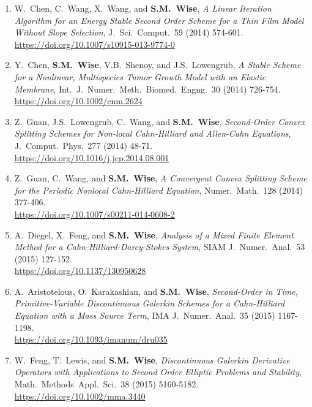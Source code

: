 \documentclass[11pt]{letter}
\begin{document}
\begin{enumerate}
    \item
W.~Chen, C.~Wang, X.~Wang, and \textbf{S.M.~Wise}, {\sl A Linear Iteration Algorithm for an Energy Stable Second Order Scheme for a Thin Film Model Without Slope Selection}, J.~Sci.~Comput.~59 (2014) 574-601.
	\\
\url{https://doi.org/10.1007/s10915-013-9774-0}

    \item
Y.~Chen, \textbf{S.M.~Wise}, V.B.~Shenoy, and J.S.~Lowengrub, {\sl A Stable Scheme for a Nonlinear, Multispecies Tumor Growth Model with an Elastic Membrane}, Int.~J.~Numer.~Meth.~Biomed.~Engng.~30 (2014) 726-754.
	\\ 
\url{https://doi.org/10.1002/cnm.2624}

	\item
Z.~Guan, J.S.~Lowengrub, C.~Wang, and \textbf{S.M.~Wise}, {\sl Second-Order Convex Splitting Schemes for Non-local Cahn-Hilliard and Allen-Cahn Equations}, J.~Comput.~Phys.~277 (2014) 48-71.
	\\ 
\url{https://doi.org/10.1016/j.jcp.2014.08.001}

	\item
Z.~Guan, C.~Wang, and \textbf{S.M.~Wise}, {\sl A Convergent Convex Splitting Scheme for the Periodic Nonlocal Cahn-Hilliard Equation}, Numer.~Math.~128 (2014) 377-406.
	\\ 
\url{https://doi.org/10.1007/s00211-014-0608-2}

	\item
A.~Diegel, X.~Feng, and \textbf{S.M.~Wise}, {\sl Analysis of a Mixed Finite Element Method for a Cahn-Hilliard-Darcy-Stokes System}, SIAM J.~Numer.~Anal.~53 (2015) 127-152.
	\\ 
\url{https://doi.org/10.1137/130950628}

	\item
A.~Aristotelous, O.~Karakashian, and \textbf{S.M.~Wise}, {\sl Second-Order in Time, Primitive-Variable Discontinuous Galerkin Schemes for a Cahn-Hilliard Equation with a Mass Source Term}, IMA J.~Numer.~Anal.~35 (2015) 1167-1198.
	\\ 
\url{https://doi.org/10.1093/imanum/dru035} 

	\item    
W.~Feng, T.~Lewis, and \textbf{S.M.~Wise}, {\sl Discontinuous Galerkin Derivative Operators with Applications to Second Order Elliptic Problems and Stability}, Math.~Methods~Appl.~Sci.~38 (2015) 5160-5182.
	\\ 
\url{https://doi.org/10.1002/mma.3440}  


\end{enumerate}
\end{document}
